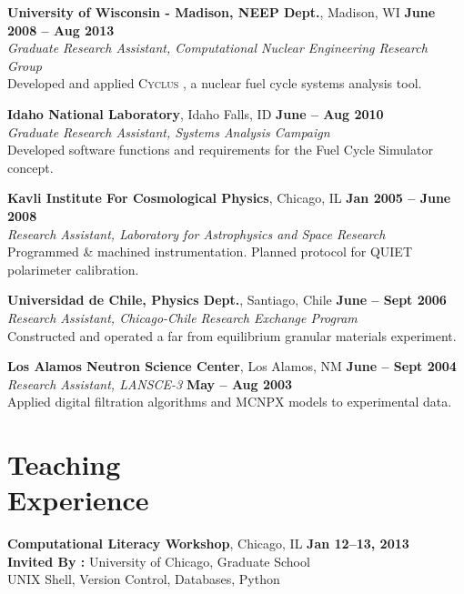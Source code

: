 \documentclass[margin,line]{resume}
\newcommand{\Cyclus}{\textsc{Cyclus }}
\begin{document}
\begin{resume}
    \textbf{University of Wisconsin - Madison, NEEP Dept.}, Madison, WI \hfill \textbf{June 2008 -- Aug 2013}\\
		\textsl{Graduate Research Assistant, Computational Nuclear Engineering Research Group}\\ 
		Developed and applied \Cyclus, a nuclear fuel cycle systems analysis tool.

    \textbf{Idaho National Laboratory}, Idaho Falls, ID \hfill \textbf{June -- Aug 2010}\\
		\textsl{Graduate Research Assistant, Systems Analysis Campaign}\\ 
		Developed software functions and requirements for the Fuel Cycle Simulator concept.

    \textbf{Kavli Institute For Cosmological Physics}, Chicago, IL \hfill \textbf{Jan 2005 -- June 2008}\\
                \textsl{Research Assistant, Laboratory for Astrophysics and Space Research}\\
                Programmed \& machined instrumentation. Planned protocol for QUIET polarimeter calibration.

    \textbf{Universidad de Chile, Physics Dept.}, Santiago, Chile \hfill \textbf{June -- Sept 2006}\\
                \textsl{Research Assistant, Chicago-Chile Research Exchange Program}\\
                 Constructed and operated a far from equilibrium granular materials experiment.

    \textbf{Los Alamos Neutron Science Center}, Los Alamos, NM \hfill \textbf{June -- Sept 2004}\\ 
                \textsl{Research Assistant, LANSCE-3} \hfill \textbf{May -- Aug 2003}\\
                Applied digital filtration algorithms and MCNPX models to experimental data.
    \pagebreak
    \section{\mysidestyle Teaching\\Experience}

    \textbf{Computational Literacy Workshop}, Chicago, IL \hfill \textbf{Jan 12--13, 2013}\\
               \textbf{Invited By : } University of Chicago, Graduate School\\
               UNIX Shell, Version Control, Databases, Python


\end{resume}
\end{document}
